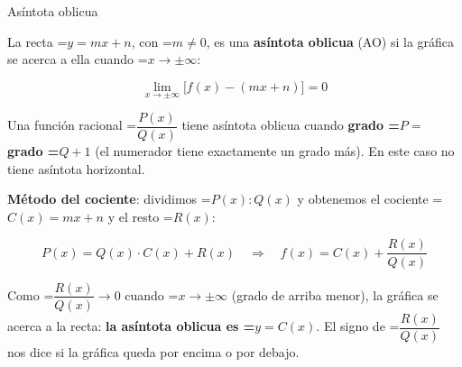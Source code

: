 \documentclass[11pt,a4paper]{article}
\newcommand{\fmm}[1]{\setbox0=\hbox{$#1$}\ifdim\wd0>\linewidth\[#1\]\else\mbox{\box0}\fi}
\newcommand{\fmuline}[1]{\textbf{\color{fmaccent}#1}}
\begin{document}
  
\begin{fmdef}{Asíntota oblicua}
\par\noindent \begin{minipage}[t]{0.48\linewidth}\vspace{0pt}\raggedright La recta \fmm{y=mx+n}, con \fmm{m\neq0}, es una \textbf{asíntota oblicua} (AO) si la gráfica se acerca a ella cuando \fmm{x\to\pm\infty}:

          
\[\lim_{x\to\pm\infty}\big[f(x)-(mx+n)\big]=0\]

          

Una función racional \fmm{\dfrac{P(x)}{Q(x)}} tiene asíntota oblicua cuando \textbf{grado \fmm{P=} grado \fmm{Q+1}} (el numerador tiene exactamente un grado más). En este caso no tiene asíntota horizontal.\end{minipage}\hfill\begin{minipage}[t]{0.48\linewidth}\vspace{0pt}\raggedright \begin{center}\end{center}\end{minipage}\par\medskip

      

\fmuline{Método del cociente}: dividimos \fmm{P(x):Q(x)} y obtenemos el cociente \fmm{C(x)=mx+n} y el resto \fmm{R(x)}:

      
\[P(x)=Q(x)\cdot C(x)+R(x)\quad\Longrightarrow\quad f(x)=C(x)+\frac{R(x)}{Q(x)}\]

      

Como \fmm{\dfrac{R(x)}{Q(x)}\to0} cuando \fmm{x\to\pm\infty} (grado de arriba menor), la gráfica se acerca a la recta: \textbf{la asíntota oblicua es \fmm{y=C(x)}}. El signo de \fmm{\dfrac{R(x)}{Q(x)}} nos dice si la gráfica queda por encima o por debajo.
\end{fmdef}
\end{document}
